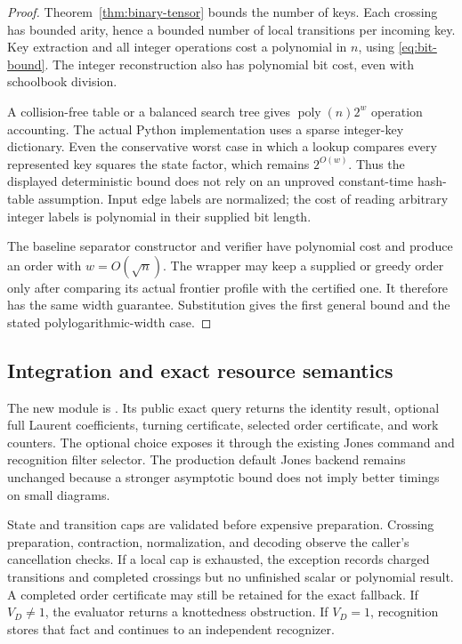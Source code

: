 \documentclass[11pt]{article}
\theoremstyle{definition}
\theoremstyle{remark}
\newcommand{\poly}{\operatorname{poly}}
\newcommand{\code}[1]{\texttt{\detokenize{#1}}}
\begin{document}
\begin{proof}
Theorem~\ref{thm:binary-tensor} bounds the number of keys. Each crossing
has bounded arity, hence a bounded number of local transitions per
incoming key. Key extraction and all integer operations cost a polynomial
in $n$, using \eqref{eq:bit-bound}. The integer reconstruction also has
polynomial bit cost, even with schoolbook division.

A collision-free table or a balanced search tree gives
$\poly(n)2^w$ operation accounting. The actual Python implementation uses
a sparse integer-key dictionary. Even the conservative worst case in
which a lookup compares every represented key squares the state factor,
which remains $2^{O(w)}$. Thus the displayed deterministic bound does
not rely on an unproved constant-time hash-table assumption. Input edge
labels are normalized; the cost of reading arbitrary integer labels is
polynomial in their supplied bit length.

The baseline separator constructor and verifier have polynomial cost and
produce an order with $w=O(\sqrt n)$. The wrapper may keep a supplied or
greedy order only after comparing its actual frontier profile with the
certified one. It therefore has the same width guarantee. Substitution
gives the first general bound and the stated polylogarithmic-width case.
\end{proof}

\subsection{Integration and exact resource semantics}

The new module is \code{fast/fastunknot/spin_jones.py}. Its public exact
query returns the identity result, optional full Laurent coefficients,
turning certificate, selected order certificate, and work counters.
The optional \code{spin-faithful} choice exposes it through the existing
Jones command and recognition filter selector. The production default
Jones backend remains unchanged because a stronger asymptotic bound
does not imply better timings on small diagrams.

State and transition caps are validated before expensive preparation.
Crossing preparation, contraction, normalization, and decoding observe
the caller's cancellation checks. If a local cap is exhausted, the
exception records charged transitions and completed crossings but no
unfinished scalar or polynomial result. A completed order certificate
may still be retained for the exact fallback. If $V_D\ne1$, the evaluator
returns a knottedness obstruction. If $V_D=1$, recognition stores that
fact and continues to an independent recognizer.
\end{document}
